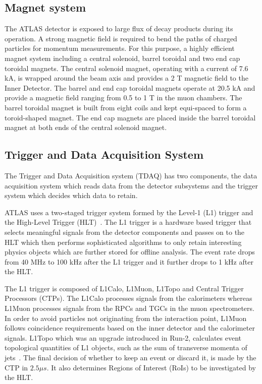 \subsection{Magnet system}
The ATLAS detector is exposed to large ﬂux of decay products during its operation. A strong magnetic
ﬁeld is required to bend the paths of charged particles for momentum measurements. For this purpose,
a highly eﬃcient magnet system including a central solenoid, barrel toroidal and two end cap toroidal
magnets. The central solenoid magnet, operating with a current of 7.6 kA, is wrapped around the beam
axis and provides a 2 T magnetic ﬁeld to the Inner Detector. The barrel and end cap toroidal magnets
operate at 20.5 kA and provide a magnetic ﬁeld ranging from 0.5 to 1 T in the muon chambers. The
barrel toroidal magnet is built from eight coils and kept equi-spaced to form a toroid-shaped magnet.
The end cap magnets are placed inside the barrel toroidal magnet at both ends of the central solenoid
magnet.

\subsection{Trigger and Data Acquisition System}
The Trigger and Data Acquisition system (TDAQ) has two components, the data acquisition system which reads data
from the detector subsystems and the trigger system which decides which data to retain.
 
ATLAS uses a two-staged trigger system formed by the Level-1 (L1) trigger and the High-Level Trigger (HLT)~\cite{The-ATLAS-collaboration_2020}. The
L1 trigger is a hardware based trigger that selects meaningful signals from the detector components and passes on 
to the HLT which then performs sophisticated algorithms to only retain interesting physics objects 
which are further stored for offline analysis. The event rate drops from 40 MHz to 100 kHz after the L1 trigger and 
it further drops to 1 kHz after the HLT.

The L1 trigger is composed of L1Calo, L1Muon, L1Topo and Central Trigger Processors (CTPs). The L1Calo processes
signals from the calorimeters whereas L1Muon processes signals from the RPCs and TGCs in the muon spectrometers. 
In order to avoid particles not originating from the interaction point, L1Muon follows coincidence requirements 
based on the inner detector and the calorimeter signals. L1Topo which was an upgrade introduced in Run-2, calculates
event topological quantities of L1 objects, such as the sum of transverse momenta of jets~\cite{Nakahama_2015}. The final decision of 
whether to keep an event or discard it, is made by the CTP in $2.5 \mu s$. It also determines Regions of Interest (RoIs)
to be investigated by the HLT.

